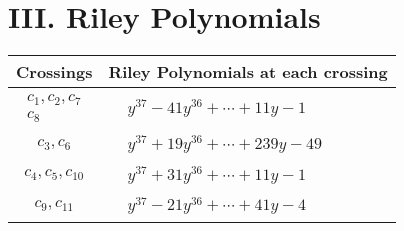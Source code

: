 \documentclass[1p]{elsarticle_modified}
\theoremstyle{definition}
\begin{document}
\centering \section*{ III. Riley Polynomials}
\begin{tabular}{m{50pt}|m{274pt}}
Crossings & \hspace{64pt}Riley Polynomials at each crossing \\
\hline $$\begin{aligned}c_{1},c_{2},c_{7}\\c_{8}\end{aligned}$$&$\begin{aligned}
&y^{37}-41 y^{36}+\cdots+11 y-1
\end{aligned}$\\
\hline $$\begin{aligned}c_{3},c_{6}\end{aligned}$$&$\begin{aligned}
&y^{37}+19 y^{36}+\cdots+239 y-49
\end{aligned}$\\
\hline $$\begin{aligned}c_{4},c_{5},c_{10}\end{aligned}$$&$\begin{aligned}
&y^{37}+31 y^{36}+\cdots+11 y-1
\end{aligned}$\\
\hline $$\begin{aligned}c_{9},c_{11}\end{aligned}$$&$\begin{aligned}
&y^{37}-21 y^{36}+\cdots+41 y-4
\end{aligned}$\\
\hline
\end{tabular}
\vskip 2pc
\end{document}
